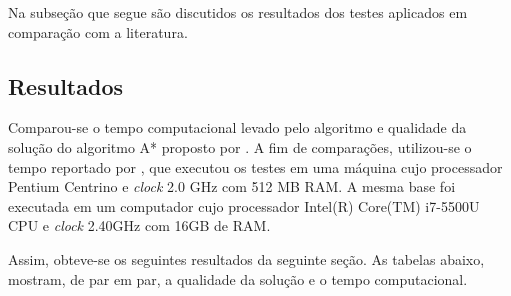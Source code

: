 \documentclass[12pt]{article}
\begin{document}
	Na subseção que segue são discutidos os resultados dos testes aplicados em comparação com a literatura.

	\subsection{Resultados}\label{sec:resultados}
		
		Comparou-se o tempo computacional levado pelo algoritmo e qualidade da solução do algoritmo A* proposto por \cite{chang:1996}. A fim de comparações, utilizou-se o tempo reportado por \cite{consoli:2009}, que executou os testes em uma máquina cujo processador Pentium Centrino e \textit{clock} 2.0 GHz com 512 MB RAM. A mesma base foi executada em um computador cujo processador Intel(R) Core(TM) i7-5500U CPU e \textit{clock} 2.40GHz com 16GB de RAM.

		Assim, obteve-se os seguintes resultados da seguinte seção. As tabelas abaixo, mostram, de par em par, a qualidade da solução e o tempo computacional.
\end{document}
